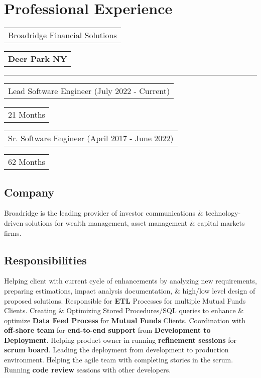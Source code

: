 \documentclass[letterpaper,11pt]{article}
\begin{document}
\section{Professional Experience}


    \noindent
    \begin{tabular}[t]{@{}l}
    \Large{Broadridge Financial Solutions}
    \end{tabular}
    \hfill
    \begin{tabular}[t]{l@{}}
    \textbf{\color{darkgray}Deer Park NY}
    \end{tabular}
    \noindent\rule{\textwidth}{0.5pt}
    \begin{tabular}[t]{@{}l}
    Lead Software Engineer (July 2022 - Current)
    \end{tabular}
    \hfill
    \begin{tabular}[t]{l@{}}
    21 Months
    \end{tabular}
    \begin{tabular}[t]{@{}l}
    Sr. Software Engineer (April 2017 - June 2022)
    \end{tabular}
    \hfill
    \begin{tabular}[t]{l@{}}
    62 Months
    \end{tabular}

    \subsection{Company}
    Broadridge is the leading provider of investor communications \& technology-driven solutions for wealth management, asset management \& capital markets firms.

    \subsection{Responsibilities}
    Helping client with current cycle of enhancements by analyzing new requirements, preparing estimations, impact analysis documentation, \& high/low level design of proposed solutions. Responsible for \textbf{\color{darkgray}ETL} Processes for multiple Mutual Funds Clients. Creating \& Optimizing Stored Procedures/SQL queries to enhance \& optimize \textbf{\color{darkgray}Data Feed Process} for \textbf{\color{darkgray}Mutual Funds} Clients. Coordination with \textbf{\color{darkgray}off-shore team} for \textbf{\color{darkgray}end-to-end support} from \textbf{\color{darkgray}Development to Deployment}. Helping product owner in running \textbf{\color{darkgray}refinement sessions} for \textbf{\color{darkgray}scrum board}. Leading the deployment from development to production environment. Helping the agile team with completing stories in the scrum. Running \textbf{\color{darkgray}code review} sessions with other developers.
\end{document}
